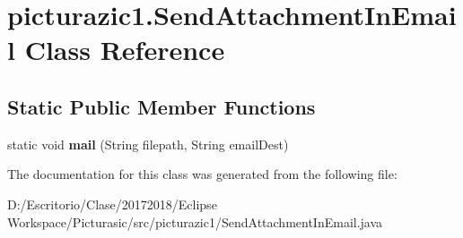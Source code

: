 \hypertarget{classpicturazic1_1_1_send_attachment_in_email}{}\section{picturazic1.\+Send\+Attachment\+In\+Email Class Reference}
\label{classpicturazic1_1_1_send_attachment_in_email}
\subsection*{Static Public Member Functions}
\begin{DoxyCompactItemize}
\item 
\mbox{\label{classpicturazic1_1_1_send_attachment_in_email_a4824d1920e4e1685ed102a499d393faa}} 
static void {\bfseries mail} (String filepath, String email\+Dest)
\end{DoxyCompactItemize}


The documentation for this class was generated from the following file\+:\begin{DoxyCompactItemize}
\item 
D\+:/\+Escritorio/\+Clase/20172018/\+Eclipse Workspace/\+Picturasic/src/picturazic1/Send\+Attachment\+In\+Email.\+java\end{DoxyCompactItemize}
